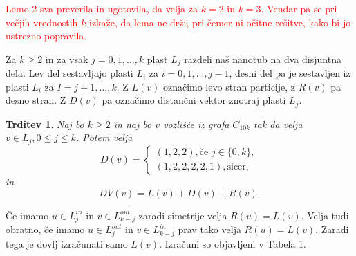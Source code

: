 \documentclass[a4paper, 12pt]{article}
\newtheorem{trditev}{Trditev}[section]
\begin{document}
\textcolor{red}{Lemo 2 sva preverila in ugotovila, da velja za $k=2$ in $k=3$. Vendar pa se pri večjih vrednostih $k$ izkaže, da lema ne drži, pri čemer ni očitne rešitve, kako bi jo ustrezno popravila.}

Za $k \geq 2$ in za vsak $j=0,1, \dots , k$ plast $L_j$ razdeli naš nanotub na dva disjuntna dela. Lev del sestavljajo plasti $L_i$ za $i = 0,1,\dots , j-1$, desni
 del pa je sestavljen iz plasti $L_i$ za $I = j+1, \dots, k$. Z $L(v)$ označimo levo stran particije, z $R(v)$ pa desno stran. Z $D(v)$ pa označimo distančni vektor znotraj plasti $L_j$.

\begin{trditev}
    Naj bo $k \geq 2$ in naj bo $v$ vozlišče iz grafa $C_{10k}$ tak da velja $v \in L_j, 0 \leq j \leq k$. Potem velja
    $$
    D(v) = \begin{cases}
            (1,2,2), \text{če } j \in \{0, k \}, \\
            (1,2,2,2,2,1), \text{sicer}, 
            \end{cases}
    $$
    in 
    $$
            DV(v) = L(v) + D(v) + R(v).
    $$

\end{trditev}

Če imamo $u \in L_j^{in}$ in $v \in L_{k-j}^{out}$ zaradi simetrije velja $R(u) = L(v)$. Velja tudi obratno, če imamo $u \in L_j^{out}$ in 
$v \in L_{k-j}^{in}$ prav tako velja $R(u) = L(v)$. Zaradi tega je dovlj izračunati samo $L(v)$. Izračuni so objavljeni v Tabela 1.
\end{document}
